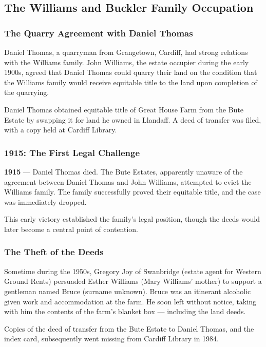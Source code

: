 \documentclass[11pt,a4paper]{article}
\begin{document}
\subsection{The Williams and Buckler Family Occupation}

\subsubsection{The Quarry Agreement with Daniel Thomas}

\begin{keyfact}
Daniel Thomas, a quarryman from Grangetown, Cardiff, had strong relations with the Williams family. John Williams, the estate occupier during the early 1900s, agreed that Daniel Thomas could quarry their land on the condition that the Williams family would receive equitable title to the land upon completion of the quarrying.
\end{keyfact}

Daniel Thomas obtained equitable title of Great House Farm from the Bute Estate by swapping it for land he owned in Llandaff. A deed of transfer was filed, with a copy held at Cardiff Library.

\subsubsection{1915: The First Legal Challenge}

\begin{timeline}
\textbf{1915} --- Daniel Thomas died. The Bute Estates, apparently unaware of the agreement between Daniel Thomas and John Williams, attempted to evict the Williams family. The family successfully proved their equitable title, and the case was immediately dropped.
\end{timeline}

This early victory established the family's legal position, though the deeds would later become a central point of contention.

\subsubsection{The Theft of the Deeds}

\begin{grievance}
Sometime during the 1950s, Gregory Joy of Swanbridge (estate agent for Western Ground Rents) persuaded Esther Williams (Mary Williams' mother) to support a gentleman named Bruce (surname unknown). Bruce was an itinerant alcoholic given work and accommodation at the farm. He soon left without notice, taking with him the contents of the farm's blanket box --- including the land deeds.

Copies of the deed of transfer from the Bute Estate to Daniel Thomas, and the index card, subsequently went missing from Cardiff Library in 1984.
\end{grievance}
\end{document}
